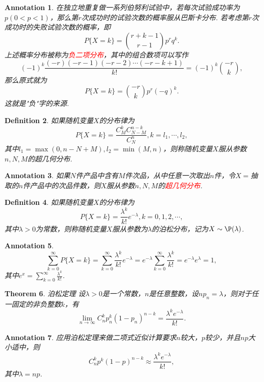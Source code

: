 \documentclass{article}
\newtheorem{theorem}{Theorem}[section]
\newtheorem{definition}[theorem]{Definition}
\newtheorem{annotation}[theorem]{Annotation}
\newcommand{\redt}[1]{\textcolor{red}{#1}}
\begin{document}
\begin{annotation}
\rm 在独立地重复做一系列伯努利试验中，若每次试验成功率为$p(0 < p < 1)$，那么第$r$次成功时的试验次数的概率服从巴斯卡分布. 若考虑第$r$次成功时的失败试验次数的概率，即
$$
P\{X = k\} = \binom{r+k-1}{r-1}p^{r}q^{k}.
$$
上述概率分布被称为\redt{负二项分布}，其中的组合数项可以写作
$$
(-1)^{k}{\frac {(-r)(-r-1)(-r-2)\dotsm (-r-k+1)}{k!}}=(-1)^{k}{\binom {-r}{k}},
$$
那么原式就为
$$
P\{X = k\} = \binom {-r}{k} p^r(-q)^k. 
$$
这就是"负"字的来源. 
\end{annotation}

\begin{definition}
\rm 如果随机变量$X$的分布律为
$$
P\{X=k\} = \frac{C_M^kC_{N-M}^{n-k}}{C_{N}^n}, k=l_1,\cdots,l_2,
$$
其中$l_1 = \max(0,n-N+M), l_2 = \min(M,n)$，则称随机变量$X$服从参数$n,N,M$的超几何分布.
\end{definition}

\begin{annotation}
\rm 如果$N$件产品中含有$M$件次品，从中任意一次取出$n$件，令$X=$抽取的$n$件产品中的次品件数，则$X$服从参数$n,N,M$的\redt{超几何分布}. 
\end{annotation}

\begin{definition}
\rm 如果随机变量$X$的分布律为
$$
P\{X=k\} = \frac{\lambda^k}{k!}e^{-\lambda}, k = 0,1,2,\cdots,
$$
其中$\lambda > 0$为常数，则称随机变量$X$服从参数为$\lambda$的泊松分布，记为$X \sim \P(\lambda)$. 
\end{definition}

\begin{annotation}
\rm 
$$
\sum\limits_{k=0}^{\infty} P\{X =k\} = \sum\limits_{k=0}^{\infty}\frac{\lambda^k}{k!}e^{-\lambda} = e^{-\lambda}\sum\limits_{k=0}^{\infty}\frac{\lambda^k}{k!} = e^{-\lambda}e^{\lambda} = 1,
$$
其中$e^x = \sum\limits_{k=0}^{\infty}\frac{\lambda^k}{k!}$.
\end{annotation}

\begin{theorem}
\rm {\color{red} 泊松定理} 设$\lambda > 0$是一个常数，$n$是任意整数，设$np_n = \lambda$，则对于任一固定的非负整数$k$，有
$$
\lim\limits_{n \rightarrow \infty}C_n^kp_n^k(1-p_n)^{n-k} = \frac{\lambda^ke^{-\lambda}}{k!}.
$$
\end{theorem}

\begin{annotation}
\rm 应用泊松定理来做二项式近似计算要求$n$较大，$p$较少，并且$np$大小适中，则
$$
C_n^kp^k(1-p)^{n-k} \approx \frac{\lambda^ke^{-\lambda}}{k!},
$$
其中$\lambda = np$.
\end{annotation}
\end{document}
